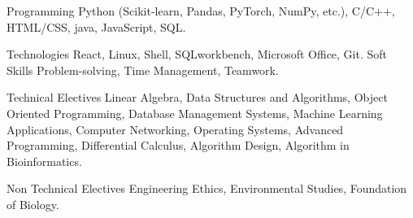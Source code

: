 

\begin{cvskills}

  \cvskill
    {Programming} %
    {Python (Scikit‑learn, Pandas, PyTorch, NumPy,  etc.), C/C++, HTML/CSS, java, JavaScript, SQL.} %

  \cvskill
    {Technologies} %
    { React, Linux, Shell, SQLworkbench, Microsoft Office, Git.} %
  \cvskill
    {Soft Skills} %
    {Problem-solving, Time Management, Teamwork.} %
  
  \cvskill
    {Technical Electives} %
    {Linear Algebra, Data Structures and Algorithms, Object Oriented Programming, Database Management Systems, Machine Learning 
    Applications, Computer Networking, Operating Systems, Advanced Programming, Differential Calculus, Algorithm Design, Algorithm in Bioinformatics.} %

  \cvskill
    {Non Technical Electives} %
    { Engineering Ethics, Environmental Studies, Foundation of Biology.} %

\end{cvskills}

